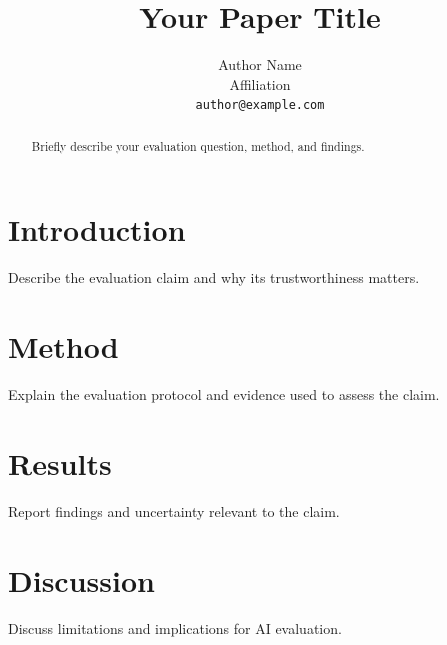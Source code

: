 \documentclass{article}
\title{Your Paper Title}
\author{%
  Author Name \\
  Affiliation \\
  \texttt{author@example.com}
}
\begin{document}
\maketitle

\begin{abstract}
Briefly describe your evaluation question, method, and findings.
\end{abstract}

\section{Introduction}
Describe the evaluation claim and why its trustworthiness matters.

\section{Method}
Explain the evaluation protocol and evidence used to assess the claim.

\section{Results}
Report findings and uncertainty relevant to the claim.

\section{Discussion}
Discuss limitations and implications for AI evaluation.
\end{document}
